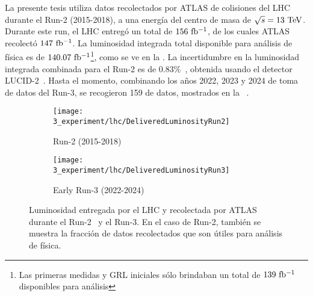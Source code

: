 La presente tesis utiliza datos recolectados por \ac{ATLAS} de colisiones \pp del \ac{LHC} durante el Run-2 (2015-2018), a una energía del centro de masa de \(\sqrt{s} = 13~\tev\). Durante este run, el \ac{LHC} entreg\'o un total de \(156~\ifb\), de los cuales \ac{ATLAS} recolect\'o \(147~\ifb\). La luminosidad integrada total disponible para análisis de f\'isica es de \(140.07~\ifb\)\footnote{Las primeras medidas y \ac{GRL} iniciales s\'olo brindaban un total de \(139~\ifb\) disponibles para an\'alisis}, como se ve en la \Fig{\ref{fig:atlas:runs:lumi_run2}}. La incertidumbre en la luminosidad integrada combinada para el Run-2 es de \(0.83\%\)~\cite{ATLAS-Lumi-Run2}, obtenida usando el detector LUCID-2~\cite{ATLAS-LUCID2}.
Hasta el momento, combinando los años 2022, 2023 y 2024 de toma de datos del Run-3, se recogieron 159 \ifb de datos, mostrados en la \Fig{\ref{fig:atlas:runs:lumi_run3}}~\cite{ATLAS-Lumi-Run3-2022,ATLAS-Lumi-Run3-2023}.

\begin{figure}[ht!]
    \centering
    \begin{subfigure}[h]{0.46\linewidth}
        \centering
        \texttt{[image: 3\_experiment/lhc/DeliveredLuminosityRun2]}
        \caption{Run-2 (2015-2018)}
        \label{fig:atlas:runs:lumi_run2}
    \end{subfigure}
    \hfill
    \begin{subfigure}[h]{0.46\linewidth}
        \centering
        \texttt{[image: 3\_experiment/lhc/DeliveredLuminosityRun3]}
        \caption{Early Run-3 (2022-2024)}
        \label{fig:atlas:runs:lumi_run3}
    \end{subfigure}
    \caption{Luminosidad entregada por el \ac{LHC} y recolectada por \ac{ATLAS} durante el Run-2~\cite{ATLAS-Lumi-Run2} y el Run-3. En el caso de Run-2, tambi\'en se muestra la fracci\'on de datos recolectados que son \'utiles para an\'alisis de f\'isica.}
    \label{fig:atlas:runs:lumi}
\end{figure}

